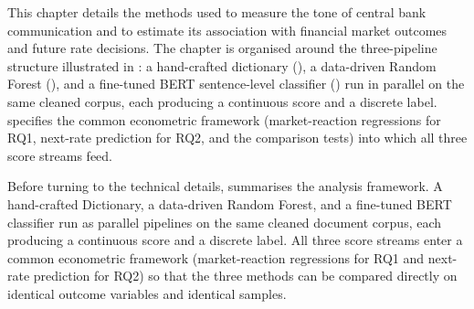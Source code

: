 
This chapter details the methods used to measure the tone of central
bank communication and to estimate its association with financial
market outcomes and future rate decisions. The chapter is organised
around the three-pipeline structure illustrated in
: a hand-crafted dictionary
(), a data-driven Random Forest
(), and a fine-tuned BERT sentence-level
classifier () run in parallel on the same
cleaned corpus, each producing a continuous score and a discrete
label.  specifies the common econometric
framework (market-reaction regressions for RQ1, next-rate prediction
for RQ2, and the comparison tests) into which all three score
streams feed.

Before turning to the technical details, 
summarises the analysis framework. A hand-crafted Dictionary, a
data-driven Random Forest, and a fine-tuned BERT classifier run
as parallel pipelines on the same cleaned document corpus, each
producing a continuous score and a discrete label. All three score
streams enter a common econometric framework (market-reaction
regressions for RQ1 and next-rate prediction for RQ2) so that the
three methods can be compared directly on identical outcome
variables and identical samples.


